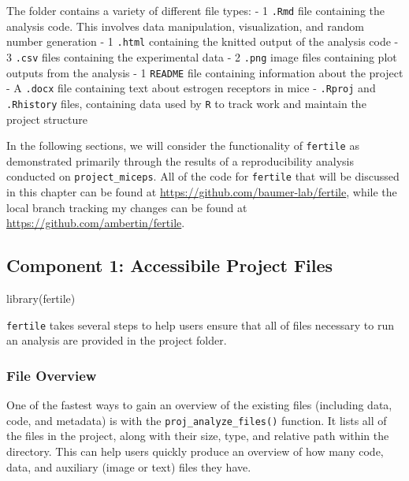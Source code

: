 \documentclass[12pt,twoside]{reedthesis}
\newenvironment{Shaded}{\begin{snugshade}}{\end{snugshade}}
\newcommand{\FunctionTok}[1]{\textcolor[rgb]{0.00,0.00,0.00}{#1}}
\newcommand{\NormalTok}[1]{#1}
\begin{document}
The folder contains a variety of different file types:
- 1 \texttt{.Rmd} file containing the analysis code. This involves data manipulation, visualization, and random number generation
- 1 \texttt{.html} containing the knitted output of the analysis code
- 3 \texttt{.csv} files containing the experimental data
- 2 \texttt{.png} image files containing plot outputs from the analysis
- 1 \texttt{README} file containing information about the project
- A \texttt{.docx} file containing text about estrogen receptors in mice
- \texttt{.Rproj} and \texttt{.Rhistory} files, containing data used by \texttt{R} to track work and maintain the project structure

In the following sections, we will consider the functionality of \texttt{fertile} as demonstrated primarily through the results of a reproducibility analysis conducted on \texttt{project\_miceps}. All of the code for \texttt{fertile} that will be discussed in this chapter can be found at \url{https://github.com/baumer-lab/fertile}, while the local branch tracking my changes can be found at \url{https://github.com/ambertin/fertile}.

\hypertarget{component-1-accessibile-project-files}{%
\subsection{Component 1: Accessibile Project Files}\label{component-1-accessibile-project-files}}
\begin{Shaded}
\begin{Highlighting}[]
\FunctionTok{library}\NormalTok{(fertile)}
\end{Highlighting}
\end{Shaded}
\texttt{fertile} takes several steps to help users ensure that all of files necessary to run an analysis are provided in the project folder.

\hypertarget{file-overview}{%
\subsubsection{File Overview}\label{file-overview}}

One of the fastest ways to gain an overview of the existing files (including data, code, and metadata) is with the \texttt{proj\_analyze\_files()} function. It lists all of the files in the project, along with their size, type, and relative path within the directory. This can help users quickly produce an overview of how many code, data, and auxiliary (image or text) files they have.
\end{document}
